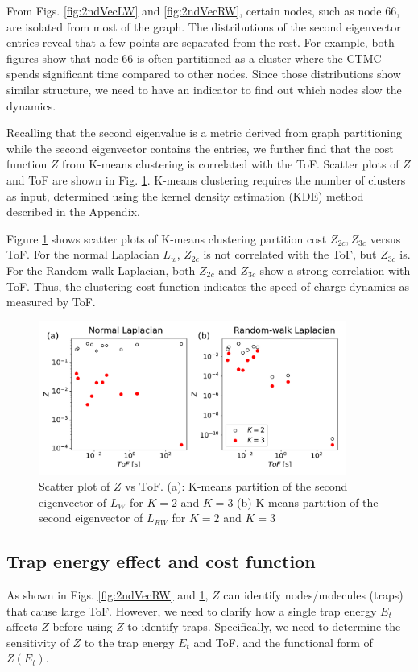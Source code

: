 \documentclass[letterpaper,12pt]{article}
\begin{document}
From Figs. \ref{fig:2ndVecLW} and \ref{fig:2ndVecRW}, certain nodes, such as node 66, are isolated from most of the graph. The distributions of the second eigenvector entries reveal that a few points are separated from the rest. For example, both figures show that node 66 is often partitioned as a cluster where the CTMC spends significant time compared to other nodes. Since those distributions show similar structure, we need to have an indicator to find out which nodes slow the dynamics.

Recalling that the second eigenvalue is a metric derived from graph partitioning while the second eigenvector contains the entries, we further find that the cost function $Z$ from K-means clustering is correlated with the ToF. Scatter plots of $Z$ and ToF are shown in Fig. \ref{fig:fig_Z_ToF}. K-means clustering requires the number of clusters as input, determined using the kernel density estimation (KDE) method described in the Appendix.

Figure \ref{fig:fig_Z_ToF} shows scatter plots of K-means clustering partition cost $Z_{2c}, Z_{3c}$ versus ToF. For the normal Laplacian $L_w$, $Z_{2c}$ is not correlated with the ToF, but $Z_{3c}$ is. For the Random-walk Laplacian, both $Z_{2c}$ and $Z_{3c}$ show a strong correlation with ToF. Thus, the clustering cost function indicates the speed of charge dynamics as measured by ToF.

\begin{figure}
    \centering
    \includegraphics[width=0.9\textwidth]{figs/fig_Z_ToF.pdf}
    \caption{Scatter plot of $Z$ vs $\text{ToF}$. (a): K-means partition of the second eigenvector of $L_W$ for $K=2$ and $K=3$ (b) K-means partition of the second eigenvector of $L_{RW}$ for $K=2$ and $K=3$}
    \label{fig:fig_Z_ToF}
\end{figure} 

\subsection{Trap energy effect and cost function}
As shown in Figs. \ref{fig:2ndVecRW} and \ref{fig:fig_Z_ToF}, $Z$ can identify nodes/molecules (traps) that cause large ToF. However, we need to clarify how a single trap energy $E_t$ affects $Z$ before using $Z$ to identify traps. Specifically, we need to determine the sensitivity of $Z$ to the trap energy $E_t$ and ToF, and the functional form of $Z(E_t)$.
\end{document}
